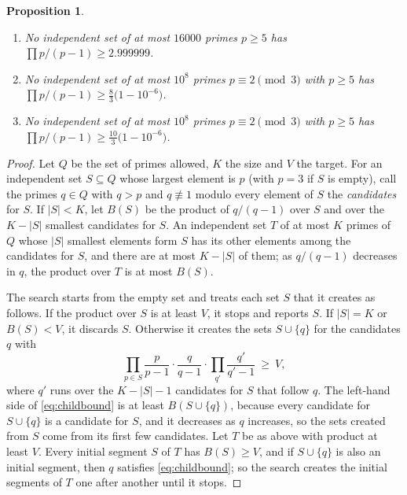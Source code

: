 \documentclass[screen,reqno]{aomart}
\numberwithin{equation}{section}
\theoremstyle{plain}
\newtheorem{proposition}[theorem]{Proposition}
\theoremstyle{definition}
\theoremstyle{remark}
\begin{document}
\begin{proposition}\label{prop:indep}
\begin{enumerate}[label=\textup{(\roman*)}]
\item No independent set of at most $16000$ primes $p\ge5$ has
  $\prod p/(p-1)\ge2.999999$.
\item No independent set of at most $10^8$ primes $p\equiv2\pmod3$
  with $p\ge5$ has $\prod p/(p-1)\ge\frac83\bigl(1-10^{-6}\bigr)$.
\item No independent set of at most $10^8$ primes $p\equiv2\pmod3$
  with $p\ge5$ has $\prod p/(p-1)\ge\frac{10}3\bigl(1-10^{-6}\bigr)$.
\end{enumerate}
\end{proposition}

\begin{proof}
Let $Q$ be the set of primes allowed, $K$ the size and $V$ the target.
For an independent set $S\subseteq Q$ whose largest element is $p$
(with $p=3$ if $S$ is empty), call the primes $q\in Q$ with $q>p$ and
$q\not\equiv1$ modulo every element of $S$ the \emph{candidates} for
$S$. If $|S|<K$, let $B(S)$ be the product of $q/(q-1)$ over $S$ and
over the $K-|S|$ smallest candidates for $S$. An independent set $T$
of at most $K$ primes of $Q$ whose $|S|$ smallest elements form $S$
has its other elements among the candidates for $S$, and there are at
most $K-|S|$ of them; as $q/(q-1)$ decreases in $q$, the product over
$T$ is at most $B(S)$.

The search starts from the empty set and treats each set $S$ that it
creates as follows. If the product over $S$ is at least $V$, it stops
and reports $S$. If $|S|=K$ or $B(S)<V$, it discards $S$. Otherwise it
creates the sets $S\cup\{q\}$ for the candidates $q$ with
\begin{equation}\label{eq:childbound}
  \prod_{p\in S}\frac{p}{p-1}\cdot\frac{q}{q-1}\cdot
  \prod_{q'}\frac{q'}{q'-1}\ \ge\ V ,
\end{equation}
where $q'$ runs over the $K-|S|-1$ candidates for $S$ that follow $q$.
The left-hand side of \eqref{eq:childbound} is at least
$B(S\cup\{q\})$, because every candidate for $S\cup\{q\}$ is a
candidate for $S$, and it decreases as $q$ increases, so the sets
created from $S$ come from its first few candidates. Let $T$ be as
above with product at least $V$. Every initial segment $S$ of $T$ has
$B(S)\ge V$, and if $S\cup\{q\}$ is also an initial segment, then $q$
satisfies \eqref{eq:childbound}; so the search creates the initial
segments of $T$ one after another until it stops.


\end{proof}
\end{document}
